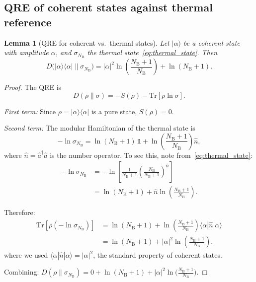 \documentclass[letterpaper,twocolumn,superscriptaddress,longbibliography]{revtex4-2}
\newtheorem{lemma}[theorem]{Lemma}
\newcommand{\Tr}{\mathrm{Tr}}
\newcommand{\ket}[1]{|#1\rangle}
\newcommand{\bra}[1]{\langle#1|}
\newcommand{\nhat}{\hat{n}}
\newcommand{\NB}{N_{\mathrm{B}}}
\begin{document}
\subsection{QRE of coherent states against thermal reference}

\begin{lemma}[QRE for coherent vs.\ thermal states]
\label{lem:QRE_coherent_thermal}
Let $\ket{\alpha}$ be a coherent state with amplitude $\alpha$,
and $\sigma_{\NB}$ the thermal state~\eqref{eq:thermal_state}.
Then
\begin{equation}
  D\bigl(\ket{\alpha}\!\bra{\alpha} \| \sigma_{\NB}\bigr)
  = |\alpha|^2 \ln\!\left(\frac{\NB+1}{\NB}\right)
    + \ln(\NB + 1).
  \label{eq:QRE_coherent_thermal}
\end{equation}
\end{lemma}

\begin{proof}
The QRE is
\begin{equation}
  D(\rho\|\sigma)
  = -S(\rho) - \Tr[\rho \ln\sigma].
  \label{eq:QRE_formula}
\end{equation}

\emph{First term:} Since $\rho = \ket{\alpha}\!\bra{\alpha}$
is a pure state, $S(\rho) = 0$.

\emph{Second term:} The modular Hamiltonian of the thermal state is
\begin{equation}
  -\ln\sigma_{\NB}
  = \ln(\NB+1)\,\mathbb{1}
    + \ln\!\left(\frac{\NB+1}{\NB}\right) \nhat,
  \label{eq:modular_H}
\end{equation}
where $\nhat = \hat{a}^\dagger \hat{a}$ is the number operator.
To see this, note from~\eqref{eq:thermal_state}:
\begin{align}
  -\ln\sigma_{\NB}
  &= -\ln\!\left[\frac{1}{\NB+1}
     \left(\frac{\NB}{\NB+1}\right)^{\!\nhat}\right]
  \nonumber \\
  &= \ln(\NB+1) + \nhat\ln\!\left(\frac{\NB+1}{\NB}\right).
  \label{eq:modular_H_derivation}
\end{align}

Therefore:
\begin{align}
  \Tr[\rho(-\ln\sigma_{\NB})]
  &= \ln(\NB+1) + \ln\!\left(\frac{\NB+1}{\NB}\right)
     \langle\alpha|\nhat|\alpha\rangle
  \nonumber \\
  &= \ln(\NB+1) + |\alpha|^2
     \ln\!\left(\frac{\NB+1}{\NB}\right),
  \label{eq:Tr_rho_lnsigma}
\end{align}
where we used $\langle\alpha|\nhat|\alpha\rangle = |\alpha|^2$,
the standard property of coherent states.

Combining: $D(\rho\|\sigma_{\NB}) = 0 + \ln(\NB+1) + |\alpha|^2
\ln\bigl(\frac{\NB+1}{\NB}\bigr)$.
\end{proof}
\end{document}
